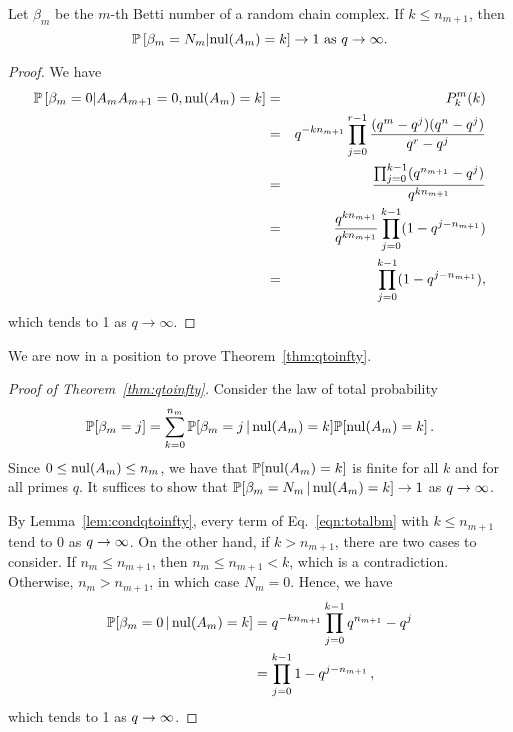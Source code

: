 \begin{lemma}
  \label{lem:condqtoinfty}
Let $\beta_m$ be the $m$-th Betti number of a random chain complex.  If $k\leq n_{m+1}$, then
\[
\mathbb{P}\left[\beta_m=N_m| \mathrm{nul}(A_{m}) = k \right] \to 1 \textrm{ as } q\to\infty.
\]
\end{lemma}

\begin{proof}
We have
	\begin{eqnarray*}
	\mathbb{P}\left[\beta_m = 0|A_{m}A_{m+1} = 0, \mathrm{nul}(A_{m}) = k \right]
    &=& P^m_k(k)\\
    &=& q^{-kn_{m+1}}\prod_{j=0}^{r-1} \frac{(q^m-q^j) (q^n - q^j)}{q^r - q^j}  \\
		&=& \frac{\prod_{j=0}^{k-1}(q^{n_{m+1}} - q^j)}
		{q^{kn_{m+1}}} \\
		&=& \frac{q^{kn_{m+1}}}{q^{kn_{m+1}}}\prod_{j=0}^{k-1}(1-q^{j-n_{m+1}})\\
		&=& \prod_{j=0}^{k-1} (1-q^{j-n_{m+1}}),
	\end{eqnarray*}
which tends to 1 as $q\to\infty$.  
\end{proof}

We are now in a position to prove Theorem~\ref{thm:qtoinfty}.

\begin{proof}[Proof of Theorem~\ref{thm:qtoinfty}]
  Consider the law of total probability
  \begin{equation}
    \label{eqn:totalbm}
    \mathbb{P}[\beta_m = j] = \sum_{k=0}^{n_m} \mathbb{P}[\beta_m = j \,|\, \mathrm{nul}(A_m) = k]
    \mathbb{P}[\mathrm{nul}(A_m) = k] \, .
  \end{equation}
   Since $0 \leq \mathrm{nul}(A_m) \leq n_m$, we have that $\mathbb{P}[\mathrm{nul}(A_m) = k]$ is
   finite for all $k$ and for all primes $q$.  It suffices to show that 
   $\mathbb{P}[\beta_m =N_m \,|\, \mathrm{nul}(A_m) = k] \rightarrow 1$ as $q \rightarrow \infty$.
   
   By Lemma~\ref{lem:condqtoinfty}, every
   term of Eq.~\eqref{eqn:totalbm} with $k\leq n_{m+1}$ tend to 0 as $q \rightarrow \infty$.
   On the other hand, if $k>n_{m+1}$, there are two cases to consider.
   If $n_m \leq n_{m+1}$, then $n_m \leq n_{m+1} < k$, which is a contradiction.
   Otherwise, $n_m > n_{m+1}$, in which case $N_m = 0$. Hence, we have
   \begin{align*}
     \mathbb{P}[\beta_m = 0 \,|\, \mathrm{nul}(A_m) = k] &= q^{-k n_{m+1}} \prod_{j=0}^{k-1}q^{n_{m+1}}-q^j \\
     &= \prod_{j=0}^{k-1} 1 - q^{j-n_{m+1}} \, ,
   \end{align*}
   which tends to 1 as $q \rightarrow \infty$.
 \end{proof}




